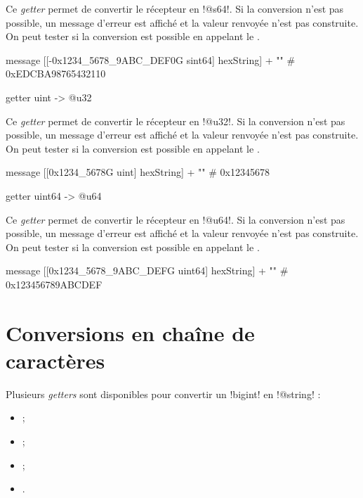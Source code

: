 Ce \emph{getter} permet de convertir le récepteur en \ggsq!@s64!. Si la conversion n'est pas possible, un message d'erreur est affiché et la valeur renvoyée n'est pas construite. On peut tester si la conversion est possible en appelant le .

\begin{galgas4}
message [[-0x1234_5678_9ABC_DEF0G sint64] hexString] + "\n" # 0xEDCBA98765432110
\end{galgas4}



\begin{galgas4box}
getter uint -> @u32
\end{galgas4box}

Ce \emph{getter} permet de convertir le récepteur en \ggsq!@u32!. Si la conversion n'est pas possible, un message d'erreur est affiché et la valeur renvoyée n'est pas construite. On peut tester si la conversion est possible en appelant le .

\begin{galgas4}
message [[0x1234_5678G uint] hexString] + "\n" # 0x12345678
\end{galgas4}



\begin{galgas4box}
getter uint64 -> @u64
\end{galgas4box}

Ce \emph{getter} permet de convertir le récepteur en \ggsq!@u64!. Si la conversion n'est pas possible, un message d'erreur est affiché et la valeur renvoyée n'est pas construite. On peut tester si la conversion est possible en appelant le .

\begin{galgas4}
message [[0x1234_5678_9ABC_DEFG uint64] hexString] + "\n" # 0x123456789ABCDEF
\end{galgas4}







\section{Conversions en chaîne de caractères}

Plusieurs \emph{getters} sont disponibles pour convertir un \ggsq!bigint! en \ggsq!@string! :
\begin{itemize}
  \item {} ;
  \item {} ;
  \item {} ;
  \item {}.
\end{itemize}

